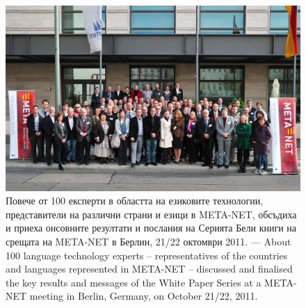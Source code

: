   \begin{figure}[htb]
    \center
    \includegraphics[width=\textwidth]{../_media/meta-net_team_ebook.jpg}
  \caption{Повече от 100 експерти в областта на езиковите технологии, представители на различни страни и езици в META-NET, обсъдиха и приеха онсовните резултати и послания на Серията Бели книги на срещата на  META-NET в Берлин, 21/22 октомври 2011. --- \textcolor{grey1}{About 100 language technology experts -- representatives of the countries and languages represented in META-NET -- discussed and finalised the key results and messages of the White Paper Series at a META-NET meeting in Berlin, Germany, on October 21/22, 2011.}}
    \medskip
  \end{figure}

  \cleardoublepage

  \label{whitepaperseries}

